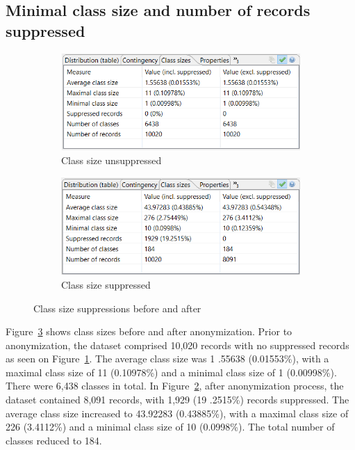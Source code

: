 \subsection{Minimal class size and number of records suppressed}

\begin{figure}[ht]
  \centering

  \begin{subfigure}{0.49\textwidth}
    \centering
    \includegraphics[width=\linewidth]{assets/class_size_unsupressed}
    \caption{Class size unsuppressed}
    \label{fig:subim1}
  \end{subfigure}
  \hfill
  \begin{subfigure}{0.49\textwidth}
    \centering
    \includegraphics[width=\linewidth]{assets/class_size_supressed}
    \caption{Class size suppressed}
    \label{fig:subim2}
  \end{subfigure}

  \caption{Class size suppressions before and after}
  \label{fig:image2}
\end{figure}

Figure~\ref{fig:image2} shows class sizes before and after anonymization. Prior to anonymization, the dataset comprised 10,020 records with no suppressed records as seen on Figure~\ref{fig:subim1}. The average
class size was 1
.55638 (0.01553\%), with a maximal class size of 11 (0.10978\%) and a minimal class size of 1 (0.00998\%). There were 6,438 classes in total.
In Figure~\ref{fig:subim2}, after anonymization process, the dataset contained 8,091 records, with 1,929 (19
.2515\%) records
suppressed. The
average
class
size increased to 43.92283 (0.43885\%), with a maximal class size of 226 (3.4112\%) and a minimal class size of 10 (0.0998\%). The total number of classes reduced to 184.

